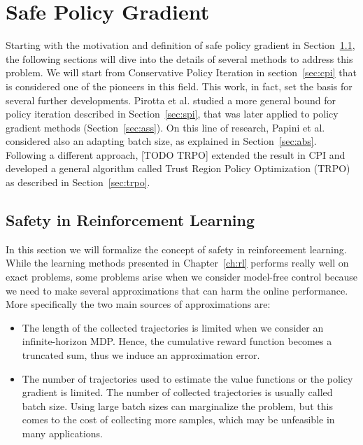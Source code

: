 \chapter{Safe Policy Gradient}
\label{ch:safepg}
\thispagestyle{empty}

Starting with the motivation and definition of safe policy gradient in Section~\ref{sec:whysafety}, the following sections will dive into the details of several methods to address this problem. We will start from Conservative Policy Iteration in section~\ref{sec:cpi} that is considered one of the pioneers in this field. This work, in fact, set the basis for several further developments. Pirotta et al. studied a more general bound for policy iteration described in Section~\ref{sec:spi}, that was later applied to policy gradient methods (Section~\ref{sec:ass}). On this line of research, Papini et al. considered also an adapting batch size, as explained in Section~\ref{sec:abs}. Following a different approach, [TODO TRPO] extended the result in CPI and developed a general algorithm called Trust Region Policy Optimization (TRPO) as described in Section~\ref{sec:trpo}. 

\section{Safety in Reinforcement Learning}
\label{sec:whysafety}
In this section we will formalize the concept of safety in reinforcement learning. While the learning methods presented in Chapter~\ref{ch:rl} performs really well on exact problems, some problems arise when we consider model-free control because we need to make several approximations that can harm the online performance. More specifically the two main sources of approximations are: 
\begin{itemize}
\item The length of the collected trajectories is limited when we consider an infinite-horizon MDP. Hence, the cumulative reward function becomes a truncated sum, thus we induce an approximation error.
\item The number of trajectories used to estimate the value functions or the policy gradient is limited. The number of collected trajectories is usually called batch size. Using large batch sizes can marginalize the problem, but this comes to the cost of collecting more samples, which may be unfeasible in many applications.
\end{itemize}

